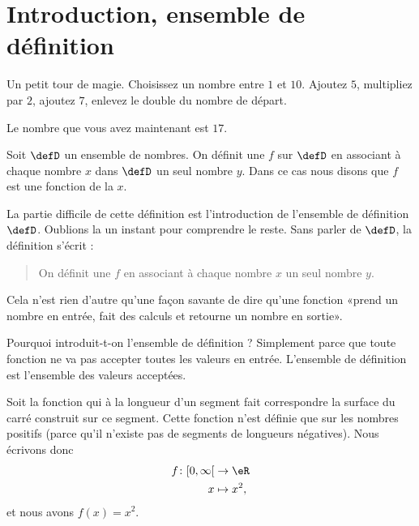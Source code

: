 
\section{Introduction, ensemble de définition}


\begin{example} \label{ExemVmCkIH}
    Un petit tour de magie. Choisissez un nombre entre \( 1\) et \( 10\). Ajoutez \( 5\), multipliez par \( 2\), ajoutez \( 7\), enlevez le double du nombre de départ.

    Le nombre que vous avez maintenant est \( 17\).
\end{example}

\begin{definition}
    Soit \( \defD\) un ensemble de nombres. On définit une  \( f\) sur \( \defD\) en associant à chaque nombre \( x\) dans \( \defD\) un seul nombre \( y\). Dans ce cas nous disons que \( f\) est une fonction de la  \( x\).
\end{definition}

La partie difficile de cette définition est l'introduction de l'ensemble de définition \( \defD\). Oublions la un instant pour comprendre le reste. Sans parler de \( \defD\), la définition s'écrit :

\begin{quote}
    On définit une  \( f\) en associant à chaque nombre \( x\) un seul nombre \( y\).
\end{quote}
Cela n'est rien d'autre qu'une façon savante de dire qu'une fonction «prend un nombre en entrée, fait des calculs et retourne un nombre en sortie».

Pourquoi introduit-t-on l'ensemble de définition ? Simplement parce que toute fonction ne va pas accepter toutes les valeurs en entrée. L'ensemble de définition est l'ensemble des valeurs acceptées.

\begin{example}
    Soit la fonction qui à la longueur d'un segment fait correspondre la surface du carré construit sur ce segment. Cette fonction n'est définie que sur les nombres positifs (parce qu'il n'existe pas de segments de longueurs négatives). Nous écrivons donc
    \begin{equation}
        \begin{aligned}
            f\colon \mathopen[ 0 , \infty [&\to \eR \\
            x&\mapsto x^2,
        \end{aligned}
    \end{equation}
    et nous avons \( f(x)=x^2\).
\end{example}

